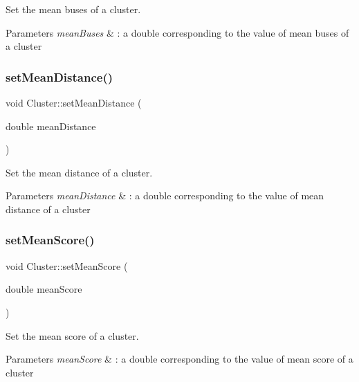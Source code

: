 Set the mean buses of a cluster. 


\begin{DoxyParams}{Parameters}
{\em mean\+Buses} & \+: a double corresponding to the value of mean buses of a cluster \\
\hline
\end{DoxyParams}
\mbox{\label{class_cluster_a42924ba44dffd0b688d811e547873e85}} 
\subsubsection{\texorpdfstring{set\+Mean\+Distance()}{setMeanDistance()}}
{\footnotesize\ttfamily void Cluster\+::set\+Mean\+Distance (\begin{DoxyParamCaption}\item[{double}]{mean\+Distance }\end{DoxyParamCaption})}



Set the mean distance of a cluster. 


\begin{DoxyParams}{Parameters}
{\em mean\+Distance} & \+: a double corresponding to the value of mean distance of a cluster \\
\hline
\end{DoxyParams}
\mbox{\label{class_cluster_a6b34e5d03bb27757547ac442f1b79288}} 
\subsubsection{\texorpdfstring{set\+Mean\+Score()}{setMeanScore()}}
{\footnotesize\ttfamily void Cluster\+::set\+Mean\+Score (\begin{DoxyParamCaption}\item[{double}]{mean\+Score }\end{DoxyParamCaption})}



Set the mean score of a cluster. 


\begin{DoxyParams}{Parameters}
{\em mean\+Score} & \+: a double corresponding to the value of mean score of a cluster \\
\hline
\end{DoxyParams}


